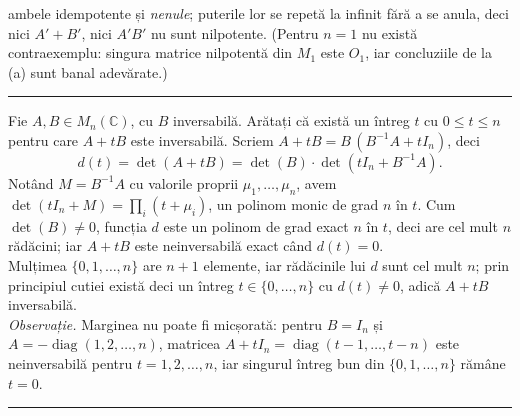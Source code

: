 ambele idempotente și \emph{nenule}; puterile lor se repetă la infinit fără a se anula, deci nici $A'+B'$, nici $A'B'$ nu sunt nilpotente. (Pentru $n=1$ nu există contraexemplu: singura matrice nilpotentă din $M_1$ este $O_1$, iar concluziile de la (a) sunt banal adevărate.)
\vspace{1mm}\hrule

Fie $A,B\in M_n(\mathbb{C})$, cu $B$ inversabilă. Arătați că există un întreg $t$ cu $0\le t\le n$ pentru care $A+tB$ este inversabilă.
\sol Scriem $A+tB=B\,(B^{-1}A+tI_n)$, deci
\[ d(t)=\det(A+tB)=\det(B)\cdot\det(tI_n+B^{-1}A). \]
Notând $M=B^{-1}A$ cu valorile proprii $\mu_1,\dots,\mu_n$, avem $\det(tI_n+M)=\prod_i(t+\mu_i)$, un polinom monic de grad $n$ în $t$. Cum $\det(B)\neq0$, funcția $d$ este un polinom de grad exact $n$ în $t$, deci are cel mult $n$ rădăcini; iar $A+tB$ este neinversabilă exact când $d(t)=0$.\\[2pt]
Mulțimea $\{0,1,\dots,n\}$ are $n+1$ elemente, iar rădăcinile lui $d$ sunt cel mult $n$; prin principiul cutiei există deci un întreg $t\in\{0,\dots,n\}$ cu $d(t)\neq0$, adică $A+tB$ inversabilă.\\[2pt]
\emph{Observație.} Marginea nu poate fi micșorată: pentru $B=I_n$ și $A=-\operatorname{diag}(1,2,\dots,n)$, matricea $A+tI_n=\operatorname{diag}(t-1,\dots,t-n)$ este neinversabilă pentru $t=1,2,\dots,n$, iar singurul întreg bun din $\{0,1,\dots,n\}$ rămâne $t=0$.
\vspace{1mm}\hrule

